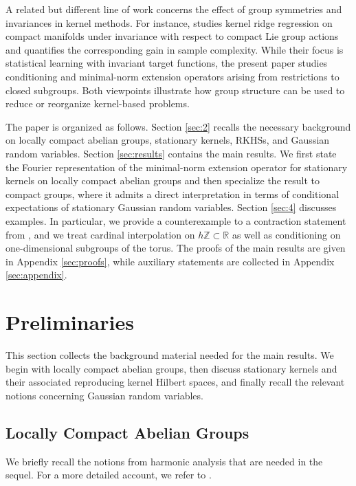 \documentclass{article}
\begin{document}
A related but different line of work concerns the effect of group symmetries and invariances in kernel methods. For instance, \cite{Behrooz} studies kernel ridge regression on compact manifolds under invariance with respect to compact Lie group actions and quantifies the corresponding gain in sample complexity. While their focus is statistical learning with invariant target functions, the present paper studies conditioning and minimal-norm extension operators arising from restrictions to closed subgroups. Both viewpoints illustrate how group structure can be used to reduce or reorganize kernel-based problems.

The paper is organized as follows. Section \ref{sec:2} recalls the necessary background on locally compact abelian groups, stationary kernels, RKHSs, and Gaussian random variables. Section \ref{sec:results} contains the main results. We first state the Fourier representation of the minimal-norm extension operator for stationary kernels on locally compact abelian groups and then specialize the result to compact groups, where it admits a direct interpretation in terms of conditional expectations of stationary Gaussian random variables. Section \ref{sec:4} discusses examples. In particular, we provide a counterexample to a contraction statement from \cite{lagatta2013continuous}, and we treat cardinal interpolation on $h\mathbb Z\subset\mathbb R$ as well as conditioning on one-dimensional subgroups of the torus. The proofs of the main results are given in Appendix \ref{sec:proofs}, while auxiliary statements are collected in Appendix \ref{sec:appendix}.

\color{black}

\section{Preliminaries}\label{sec:prelim}\label{sec:2} 
This section collects the background material needed for the main results. We begin with locally compact abelian groups, then discuss stationary kernels and their associated reproducing kernel Hilbert spaces, and finally recall the relevant notions concerning Gaussian random variables.

\subsection{Locally Compact Abelian Groups}
We briefly recall the notions from harmonic analysis that are needed in the sequel. For a more detailed account, we refer to \cite{Folland}.
\end{document}
